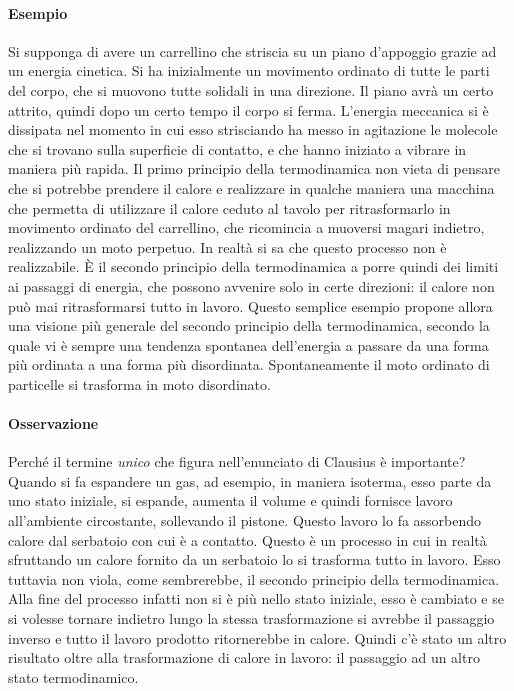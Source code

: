 \documentclass[10pt,a4paper]{book}
\begin{document}
\paragraph{Esempio} Si supponga di avere un carrellino che striscia su un piano d'appoggio grazie ad un energia cinetica. Si ha inizialmente un movimento ordinato di tutte le parti del corpo, che si muovono tutte solidali in una direzione. Il piano avrà un certo attrito, quindi dopo un certo tempo il corpo si ferma. L'energia meccanica si è dissipata nel momento in cui esso strisciando ha messo in agitazione le molecole che si trovano sulla superficie di contatto, e che hanno iniziato a vibrare in maniera più rapida. Il primo principio della termodinamica non vieta di pensare che si potrebbe prendere il calore e realizzare in qualche maniera una macchina che permetta di utilizzare il calore ceduto al tavolo per ritrasformarlo in movimento ordinato del carrellino, che ricomincia a muoversi magari indietro, realizzando un moto perpetuo. In realtà si sa che questo processo non è realizzabile. È il secondo principio della termodinamica a porre quindi dei limiti ai passaggi di energia, che possono avvenire solo in certe direzioni: il calore non può mai ritrasformarsi tutto in lavoro. Questo semplice esempio propone allora una visione più generale del secondo principio della termodinamica, secondo la quale vi è sempre una tendenza spontanea dell'energia a passare da una forma più ordinata a una forma più disordinata. Spontaneamente il moto ordinato di particelle si trasforma in moto disordinato.

\paragraph{Osservazione} Perché il termine \emph{unico} che figura nell'enunciato di Clausius è importante? Quando si fa espandere un gas, ad esempio, in maniera isoterma, esso parte da uno stato iniziale, si espande, aumenta il volume e quindi fornisce lavoro all'ambiente circostante, sollevando il pistone. Questo lavoro lo fa assorbendo calore dal serbatoio con cui è a contatto.
Questo è un processo in cui in realtà sfruttando un calore fornito da un serbatoio lo si trasforma tutto in lavoro. Esso tuttavia non viola, come sembrerebbe, il secondo principio della termodinamica. Alla fine del processo infatti non si è più nello stato iniziale, esso è cambiato e se si volesse tornare indietro lungo la stessa trasformazione si avrebbe il passaggio inverso e tutto il lavoro prodotto ritornerebbe in calore. Quindi c'è stato un altro risultato oltre alla trasformazione di calore in lavoro: il passaggio ad un altro stato termodinamico.
\end{document}

